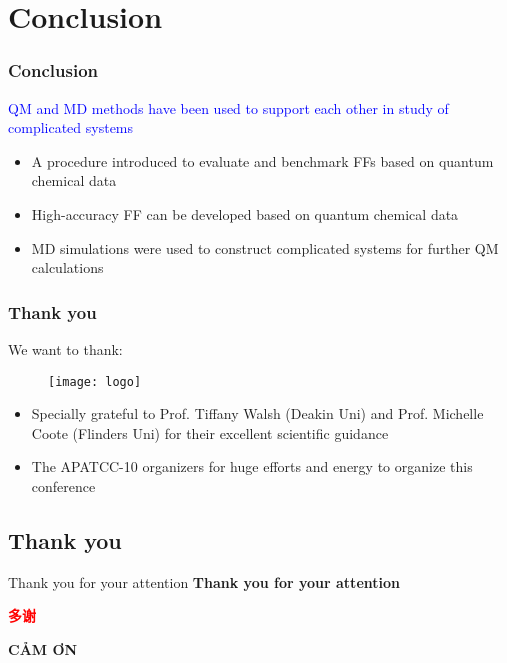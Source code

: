 \documentclass[xcolor=table,aspectratio=169]{beamer}
\begin{document}
\section{Conclusion}

\begin{frame}
	\frametitle{Conclusion}
	\textcolor{blue}{QM and MD methods have been used to support each other in study of complicated systems}
	\begin{itemize}
		\item A procedure introduced to evaluate and benchmark FFs based on quantum chemical data 
		\item High-accuracy FF can be developed based on quantum chemical data
		\item MD simulations were used to construct complicated systems for further QM calculations
	\end{itemize}
\end{frame}


\begin{frame}
	\frametitle{Thank you}
	We want to thank:
	\begin{figure}
		\texttt{[image: logo]}
	\end{figure}
	\begin{itemize}
		\item Specially grateful to Prof. Tiffany Walsh (Deakin Uni) and Prof. Michelle Coote (Flinders Uni) for their excellent scientific guidance
		\item The APATCC-10 organizers for huge efforts and energy to organize this conference
	\end{itemize}
\end{frame}







\subsection*{Thank you}

\begin{frame}{Thank you for your attention}
	\centering
	\textcolor{flinders-blue}{\textbf{\LARGE Thank you for your attention}}\\

	\vspace{0.5cm}

	\begin{CJK*}{UTF8}{zhsong}
		\textcolor{red}{\textbf{\LARGE 多谢}} \clearpage\end{CJK*}

	\textcolor{kul-blue}{\textbf{\LARGE CẢM ƠN}}\\

\end{frame}
\end{document}
